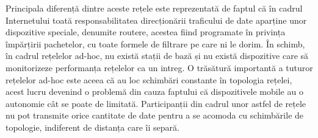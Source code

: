 \documentclass[12pt,a4paper]{report}
\begin{document}
Principala diferență dintre aceste rețele este reprezentată de faptul că în cadrul Internetului toată responsabilitatea direcționării traficului de date aparține unor dispozitive speciale, denumite routere, acestea fiind programate în privința împărțirii pachetelor, cu toate formele de filtrare pe care ni le dorim. În schimb, în cadrul rețelelor ad-hoc, nu există stații de bază și nu există dispozitive care să monitorizeze performanța rețelelor ca un intreg. O trăsătură importantă a tuturor rețelelor ad-hoc este aceea că au loc schimbări constante în topologia rețelei, acest lucru devenind o problemă din cauza faptului că dispozitivele mobile au o autonomie cât se poate de limitată. Participanții din cadrul unor astfel de rețele nu pot transmite orice cantitate de date pentru a se acomoda cu schimbările de topologie, indiferent de distanța care îi separă.
\end{document}
